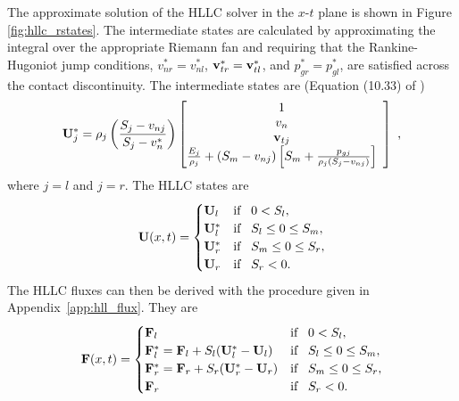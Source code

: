 The approximate solution of the HLLC solver in the $x$-$t$ plane is shown in Figure \ref{fig:hllc_rstates}.  The intermediate states are calculated by approximating the integral over the appropriate Riemann fan and requiring that the Rankine-Hugoniot jump conditions, $v_{nr}^* = v_{nl}^*$, $\mathbf{v}_{tr}^* = \mathbf{v}_{tl}^*$, and $p_{gr}^* = p_{gl}^*$, are satisfied across the contact discontinuity.  The intermediate states are (Equation (10.33) of \citep{Toro:1999})
\[
\mbf{U}_j^* = 
\rho_j \left( \frac{S_j - v_{nj}}{S_j - v_n^*} \right)
\left[\begin{array}{@{}ccc}
1 \\
v_n \\
\mbf{v}_{t j} \\
\frac{E_j}{\rho_j}  + (S_m - v_{nj}) \left[ S_m + \frac{p_{gj}}{\rho_j(S_j - v_{nj})} \right]  \\
\end{array}\right] \text{ ,} 
\]
where $j=l$ and $j=r$.  The HLLC states are
\begin{gather}
\label{eqn:hllc_states}
\mathbf{U}(x,t) = 
\begin{cases}
\mathbf{U}_l   & \text{if}\;\;\; 0 < S_l, \\
\mathbf{U}_l^*   & \text{if}\;\;\; S_l \le 0 \le S_m, \\
\mathbf{U}_r^*   & \text{if}\;\;\; S_m \le 0 \le S_r, \\
\mathbf{U}_r   & \text{if}\;\;\; S_r < 0. \\
\end{cases}
\end{gather}
The HLLC fluxes can then be derived with the procedure given in Appendix~\ref{app:hll_flux}.  They are 
\begin{gather}
\label{eqn:hllc_flux}
\mbf{F}(x,t) = 
\begin{cases}
\mbf{F}_l   \phantom{= \mbf{F}_l  + S_l (\mbf{U_l^*} - \mbf{U_l}} & \text{if}\;\;\; 0 < S_l, \\
\mbf{F}_l^* = \mbf{F}_l  + S_l (\mbf{U}_l^* - \mbf{U}_l) & \text{if}\;\;\; S_l \le 0 \le S_m, \\
\mbf{F}_r^* = \mbf{F}_r  + S_r (\mbf{U}_r^* - \mbf{U}_r)  & \text{if}\;\;\; S_m \le 0 \le S_r, \\
\mbf{F}_r  \phantom{= \mbf{F}_r  + S_r (\mbf{U_r^*} - \mbf{U_r}} & \text{if}\;\;\; S_r < 0. \\
\end{cases}
\end{gather}

